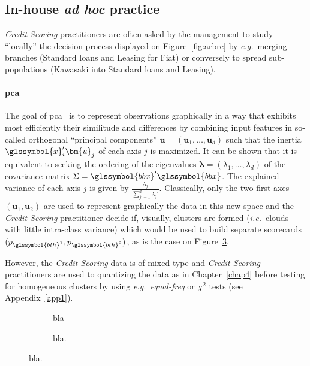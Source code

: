 \subsection{In-house \textit{ad hoc} practice} \label{subsec:adhoc}

\textit{Credit Scoring} practitioners are often asked by the management to study ``locally'' the decision process displayed on Figure~\ref{fig:arbre} by \textit{e.g.}\ merging branches (Standard loans and Leasing for Fiat) or conversely to spread sub-populations (Kawasaki into Standard loans and Leasing).

\paragraph{\gls{pca}}

The goal of \gls{pca}~\cite{pages2014multiple} is to represent observations graphically in a way that exhibits most efficiently their similitude and differences by combining input features in so-called orthogonal ``principal components'' $\bm{u} = (\bm{u}_1,\dots,\bm{u}_d)$ such that the inertia $\glssymbol{x}_i' \bm{u}_j$ of each axis $j$ is maximized. It can be shown that it is equivalent to seeking the ordering of the eigenvalues $\bm{\lambda} = (\lambda_1,\dots,\lambda_d)$ of the covariance matrix $\Sigma = \glssymbol{bbx}'\glssymbol{bbx}$. The explained variance of each axis $j$ is given by $\frac{\lambda_j}{\sum_{j'=1}^d \lambda_j'}$. Classically, only the two first axes $(\bm{u}_1,\bm{u}_2)$ are used to represent graphically the data in this new space and the \textit{Credit Scoring} practitioner decide if, visually, clusters are formed (\textit{i.e.}\ clouds with little intra-class variance) which would be used to build separate scorecards $(p_{\glssymbol{bth}^{1}},p_{\glssymbol{bth}^{2}})$, as is the case on Figure~\ref{fig:pca}.

However, the \textit{Credit Scoring} data is of mixed type and \textit{Credit Scoring} practitioners are used to quantizing the data as in Chapter~\ref{chap4} before testing for homogeneous clusters by using \textit{e.g.\ equal-freq} or $\chi^2$ tests (see Appendix~\ref{app1}).

\begin{figure}[!htb]
{\setlength{\parindent}{0cm}}

\begin{multicols}{2}
\centering
\begin{subfigure}[t]{0.45\textwidth}
\centering
\resizebox{\textwidth}{!}{}
\caption{\label{fig:pca1} bla}
\end{subfigure}%
\columnbreak
\hspace*{1cm} \begin{subfigure}[t]{0.45\textwidth}
\centering
\resizebox{\textwidth}{!}{}
\caption{\label{fig:pca2} bla.}
\end{subfigure}
\end{multicols}

\caption{\label{fig:pca} bla.}
\end{figure}

